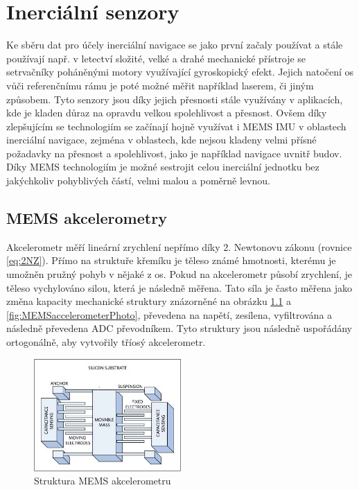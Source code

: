 \chapter{Inerciální senzory}
Ke sběru dat pro účely inerciální navigace se jako první začaly používat a stále používají např. v letectví složité, velké a drahé mechanické přístroje se setrvačníky poháněnými motory využívající gyroskopický efekt. Jejich natočení os vůči referenčnímu rámu je poté možné měřit například laserem, či jiným způsobem. Tyto senzory jsou díky jejich přesnosti stále využívány v aplikacích, kde je kladen důraz na opravdu velkou spolehlivost a přesnost. Ovšem díky zlepšujícím se technologiím se začínají hojně využívat i \ac{MEMS} \ac{IMU} v oblastech inerciální navigace, zejména v oblastech, kde nejsou kladeny velmi přísné požadavky na přesnost a spolehlivost, jako je například navigace uvnitř budov. Díky \ac{MEMS} technologiím je možné sestrojit celou inerciální jednotku bez jakýchkoliv pohyblivých částí, velmi malou a poměrně levnou. \cite{Tittertonc2004} \cite{Grewal2013}

\section{MEMS akcelerometry} \label{MEMSaccel}
Akcelerometr měří lineární zrychlení nepřímo díky 2. Newtonovu zákonu (rovnice \ref{eq:2NZ}). Přímo na struktuře křemíku je těleso známé hmotnosti, kterému je umožněn pružný pohyb v nějaké z os. Pokud na akcelerometr působí zrychlení, je těleso vychylováno silou, která je následně měřena. Tato síla je často měřena jako změna kapacity mechanické struktury znázorněné na obrázku \ref{fig:MEMSaccelerometer} a \ref{fig:MEMSaccelerometerPhoto}, převedena na napětí, zesílena, vyfiltrována a následně převedena \ac{ADC} převodníkem.
Tyto struktury jsou následně uspořádány ortogonálně, aby vytvořily tříosý akcelerometr. \cite{Dadafshar2014}

\begin{figure}[h]
    \centering
    \includegraphics[width=0.5\textwidth]{obrazky/MEMSaccelerometer}
    \caption{Struktura MEMS akcelerometru \cite{Dadafshar2014}}
    \label{fig:MEMSaccelerometer}
\end{figure}

